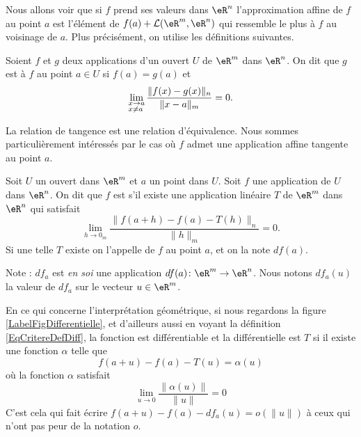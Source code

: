 Nous allons voir que si $f$ prend ses valeurs dans $\eR^n$ l'approximation affine de $f$ au point $a$ est l'élément de $ f(a)+\mathcal{L}(\eR^m,\eR^n)$ qui ressemble le plus à $f$ au voisinage de $a$. Plus précisément, on utilise les définitions suivantes.         
\begin{definition}
  Soient $f$ et $g$ deux applications d'un ouvert $U$ de $\eR^m$ dans $\eR^n$. On dit que $g$ est  à $f$ au point $a\in U$ si $f(a)=g(a)$ et 
\[
\lim_{\begin{subarray}{l}
    x\to a\\ x\neq a
  \end{subarray}}\frac{\|f(x)-g(x)\|_n}{\|x-a\|_m}=0.
\]
\end{definition}
La relation de tangence est une relation d'équivalence. Nous sommes particulièrement intéressés par le cas où $f$ admet une application  affine tangente au point $a$. 
\begin{definition}      \label{DefDifferentiellePta}
  Soit $U$ un ouvert dans $\eR^m$ et $a$ un point dans $U$. Soit $f$ une application de $U$ dans $\eR^n$. On dit que $f$ est  s'il existe une application linéaire $T$ de $\eR^m$ dans $\eR^n$ qui satisfait
  \begin{equation}	\label{EqCritereDefDiff}
\lim_{h\to 0_m}\frac{\|f(a+h)-f(a)-T(h)\|_n}{\|h\|_m}=0.    
  \end{equation}
  Si une telle $T$ existe on l'appelle  de $f$ au point $a$, et on la note $df(a)$. 
\end{definition}

Note : $df_a$ est \emph{en soi} une application $df(a)\colon \eR^m\to \eR^n$. Nous notons $df_a(u)$ la valeur de $df_a$ sur le vecteur $u\in\eR^m$.


\newcommand{\CaptionFigDifferentielle}{Interprétation géométrique de la différentielle.}

En ce qui concerne l'interprétation géométrique, si nous regardons la figure \ref{LabelFigDifferentielle}, et d'ailleurs aussi en voyant la définition \ref{EqCritereDefDiff}, la fonction est différentiable et la différentielle est \( T\) si il existe une fonction \( \alpha\) telle que
\begin{equation}
    f(a+u)-f(a)-T(u)=\alpha(u)
\end{equation}
où la fonction \( \alpha\) satisfait
\begin{equation}		\label{EqPresqueTa}
	\lim_{u\to 0} \frac{ \| \alpha(u)\| }{\| u \|}=0
\end{equation}
C'est cela qui fait écrire \( f(a+u)-f(a)-df_a(u)=o(\| u \|)\) à ceux qui n'ont pas peur de la notation \( o\).

